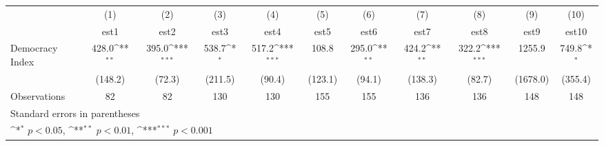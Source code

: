 {
\def\sym#1{\ifmmode^{#1}\else\(^{#1}\)\fi}
\begin{tabular}{l*{10}{c}}
\hline\hline
                    &\multicolumn{1}{c}{(1)}         &\multicolumn{1}{c}{(2)}         &\multicolumn{1}{c}{(3)}         &\multicolumn{1}{c}{(4)}         &\multicolumn{1}{c}{(5)}         &\multicolumn{1}{c}{(6)}         &\multicolumn{1}{c}{(7)}         &\multicolumn{1}{c}{(8)}         &\multicolumn{1}{c}{(9)}         &\multicolumn{1}{c}{(10)}         \\
                    &        est1         &        est2         &        est3         &        est4         &        est5         &        est6         &        est7         &        est8         &        est9         &       est10         \\
\hline
Democracy Index     &       428.0\sym{**} &       395.0\sym{***}&       538.7\sym{*}  &       517.2\sym{***}&       108.8         &       295.0\sym{**} &       424.2\sym{**} &       322.2\sym{***}&      1255.9         &       749.8\sym{*}  \\
                    &     (148.2)         &      (72.3)         &     (211.5)         &      (90.4)         &     (123.1)         &      (94.1)         &     (138.3)         &      (82.7)         &    (1678.0)         &     (355.4)         \\
\hline
Observations        &          82         &          82         &         130         &         130         &         155         &         155         &         136         &         136         &         148         &         148         \\
\hline\hline
\multicolumn{11}{l}{\footnotesize Standard errors in parentheses}\\
\multicolumn{11}{l}{\footnotesize \sym{*} \(p<0.05\), \sym{**} \(p<0.01\), \sym{***} \(p<0.001\)}\\
\end{tabular}
}
